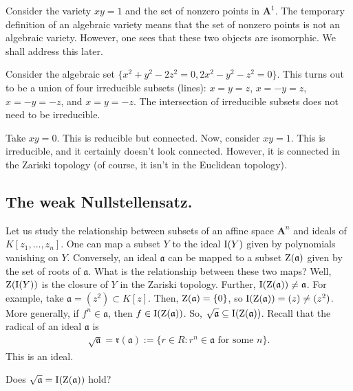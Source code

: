 \documentclass [11 pt, oneside] {article}
\begin{document}
\begin{example}[ ]\label{}
Consider the variety $xy=1$ and the set of nonzero points in $\mathbf{A}^1$. The temporary definition of an algebraic variety means that the set of nonzero points is not an algebraic variety. However, one sees that these two objects are isomorphic. We shall address this later.
\end{example}

\begin{example}[ ]\label{}
Consider the algebraic set $\{x^2+y^2 -2z^2=0, 2x^2 - y^2 - z^2=0\}$. This turns out to be a union of four irreducible subsets (lines): $x=y=z$, $x=-y=z$, $x=-y=-z$, and $x=y=-z$. The intersection of irreducible subsets does not need to be irreducible.
\end{example}

\begin{example}[ ]\label{}
Take $xy=0$. This is reducible but connected. Now, consider $xy=1$. This is irreducible, and it certainly doesn't look connected. However, it is connected in the Zariski topology (of course, it isn't in the Euclidean topology).
\end{example}


\subsection{The weak Nullstellensatz.}
Let us study the relationship between subsets of an affine space $\mathbf{A}^n$ and ideals of $K[z_1,\hdots, z_n]$. One can map a subset $Y$ to the ideal $\operatorname{I}(Y)$ given by polynomials vanishing on $Y$. Conversely, an ideal $\mathfrak{a}$ can be mapped to a subset $\operatorname{Z}(\mathfrak a)$ given by the set of roots of $\mathfrak{a}$. What is the relationship between these two maps? Well, $\operatorname{Z}(\operatorname{I}(Y))$ is the closure of $Y$ in the Zariski topology. Further, $\operatorname{I}(\operatorname{Z}(\mathfrak{a}))\ne \mathfrak{a}$. For example, take $\mathfrak{a}=(z^2)\subset K[z]$. Then, $\operatorname{Z}(\mathfrak{a}) = \{0\}$, so $\operatorname{I}(\operatorname{Z}(\mathfrak{a})) =(z)\ne (z^2)$. More generally, if $f^n\in \mathfrak{a}$, then $f\in \operatorname{I}(\operatorname{Z}(\mathfrak a))$. So, $\sqrt{\mathfrak{a}} \subseteq \operatorname{I}(\operatorname{Z}(\mathfrak{a}))$. Recall that the radical of an ideal ${\mathfrak a}$ is
\begin{align*}
	\sqrt{\mathfrak{a}} = \mathfrak{r}(\mathfrak{a}) := \{ r\in R : r^n \in \mathfrak{a} \textrm{ for some $n$}\}.
\end{align*}
This is an ideal.

\begin{problem}
	Does $\sqrt{\mathfrak{a}}= \operatorname{I}(\operatorname{Z}(\mathfrak{a})) $ hold?
\end{problem}
\end{document}
